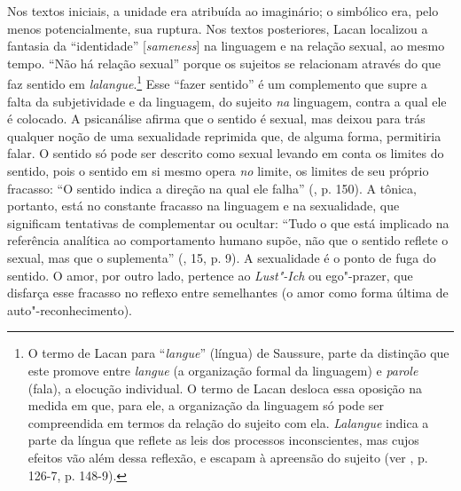 Nos textos iniciais, a unidade era atribuída ao imaginário; o simbólico
era, pelo menos potencialmente, sua ruptura. Nos textos posteriores,
Lacan localizou a fantasia da ``identidade'' {[}\emph{sameness}{]} na
linguagem e na relação sexual, ao mesmo tempo. ``Não há relação sexual''
porque os sujeitos se relacionam através do que faz sentido em
\emph{lalangue}.\footnote{O termo de Lacan para ``\emph{langue}''
  (língua) de Saussure, parte da distinção que este promove entre
  \emph{langue} (a organização formal da linguagem) e \emph{parole}
  (fala), a elocução individual. O termo de Lacan desloca essa oposição
  na medida em que, para ele, a organização da linguagem só pode ser
  compreendida em termos da relação do sujeito com ela. \emph{Lalangue}
  indica a parte da língua que reflete as leis dos processos
  inconscientes, mas cujos efeitos vão além dessa reflexão, e escapam à
  apreensão do sujeito (ver , p. 126-7, p. 148-9).} Esse ``fazer
sentido'' é um complemento que supre a falta da subjetividade e da
linguagem, do sujeito \emph{na} linguagem, contra a qual ele é colocado.
A psicanálise afirma que o sentido é sexual, mas deixou para trás
qualquer noção de uma sexualidade reprimida que, de alguma forma,
permitiria falar. O sentido só pode ser descrito como sexual levando em
conta os limites do sentido, pois o sentido em si mesmo opera \emph{no}
limite, os limites de seu próprio fracasso: ``O sentido indica a direção
na qual ele falha'' (, p. 150). A tônica, portanto, está no
constante fracasso na linguagem e na sexualidade, que significam
tentativas de complementar ou ocultar: ``Tudo o que está implicado na
referência analítica ao comportamento humano supõe, não que o sentido
reflete o sexual, mas que o suplementa'' (, 15, p. 9). A sexualidade %
é o ponto de fuga do sentido. O amor, por outro lado, pertence ao
\emph{Lust"-Ich} ou ego"-prazer, que disfarça esse fracasso no reflexo
entre semelhantes (o amor como forma última de auto"-reconhecimento).

